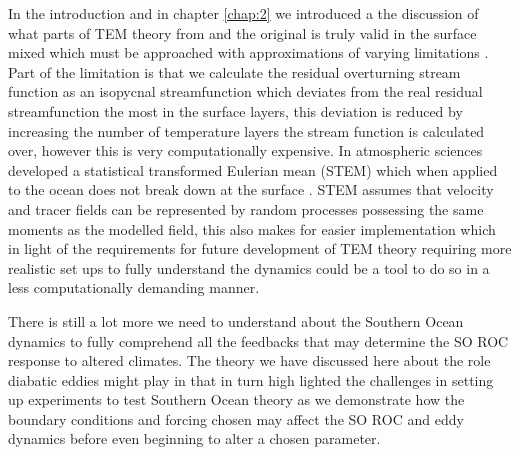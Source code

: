 In the introduction and in chapter \ref{chap:2} we introduced a the discussion of what parts of TEM theory from \citet{Marshall2003} and the original \citet{Andrews1976} is truly valid in the surface mixed which must be approached with approximations of varying limitations \citep{Plumb2005}. Part of the limitation is that we calculate the residual overturning stream function as an isopycnal streamfunction which deviates from the real residual streamfunction the most in the surface layers, this deviation is reduced by increasing the number of temperature layers the stream function is calculated over, however this is very computationally expensive. In atmospheric sciences \cite{Pauluis2011} developed a statistical transformed Eulerian mean (STEM) which when applied to the ocean does not break down at the surface \citep{wolfe2014}. STEM assumes that velocity and tracer fields can be represented by random processes possessing the same moments as the modelled field, this also makes for easier implementation which in light of the requirements for future development of TEM theory requiring more realistic set ups to fully understand the dynamics could be a tool to do so in a less computationally demanding manner.

There is still a lot more we need to understand about the Southern Ocean dynamics to fully comprehend all the feedbacks that may determine the SO ROC response to altered climates. The theory we have discussed here about the role diabatic eddies might play in that in turn high lighted the challenges in setting up experiments to test Southern Ocean theory as we demonstrate how the boundary conditions and forcing chosen may affect the SO ROC and eddy dynamics before even beginning to alter a chosen parameter. 


